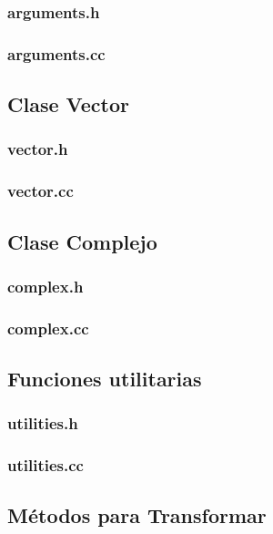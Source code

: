 \documentclass{article}
\begin{document}
    \subsubsection{arguments.h}
      
    \subsubsection{arguments.cc}
      
  \subsection{Clase Vector}
    \subsubsection{vector.h}
      
    \subsubsection{vector.cc}
      
  \subsection{Clase Complejo}
    \subsubsection{complex.h}
      
    \subsubsection{complex.cc}
      
  \subsection{Funciones utilitarias}
    \subsubsection{utilities.h}
      
    \subsubsection{utilities.cc}
      
  \subsection{Métodos para Transformar}
\end{document}
